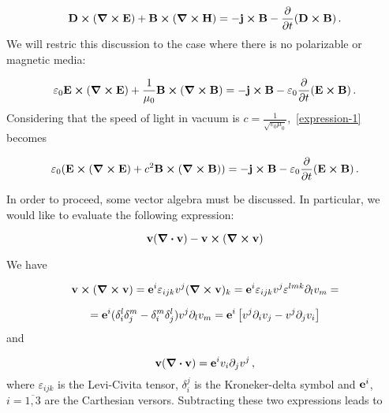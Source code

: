 \documentclass[12pt, class=report, crop=false]{standalone}
\begin{document}
\begin{equation}
  \vb{D}\cp (\curl{\vb{E}}) + \vb{B}\cp (\curl{\vb{H}}) = - \vb{j}\cp \vb{B} - \pdv{t} (\vb{D}\cp\vb{B}) \,.
\end{equation}
We will restric this discussion to the case where there is no polarizable or magnetic media:

\begin{equation}
  \label{expression-1}
  \varepsilon_0 \vb{E}\cp (\curl{\vb{E}}) + \frac{1}{\mu_0}\vb{B}\cp (\curl{\vb{B}}) = - \vb{j}\cp \vb{B} - \varepsilon_0 \pdv{t} (\vb{E}\cp\vb{B}) \,.
\end{equation}
Considering that the speed of light in vacuum is \(c=\frac{1}{\sqrt{\varepsilon_0 \mu_0}}\),~\cref{expression-1} becomes

\begin{equation}
  \label{expression-1}
  \varepsilon_0 (\vb{E}\cp (\curl{\vb{E}}) + c^{2} \vb{B}\cp (\curl{\vb{B}})) = - \vb{j}\cp \vb{B} - \varepsilon_0 \pdv{t} (\vb{E}\cp\vb{B}) \,.
\end{equation}

In order to proceed, some vector algebra must be discussed. In particular, we would like to evaluate the following expression:

\begin{equation*}
  \vb{v}(\div{\vb{v}}) - \vb{v}\cp(\curl{\vb{v}})
\end{equation*}

We have

\begin{equation*}
  \vb{v}\cp(\curl{\vb{v}}) = \vb{e}^{i} \varepsilon_{ijk} v^{j} (\curl{\vb{v}})_{k} = \vb{e}^{i} \varepsilon_{ijk} v^{j} \varepsilon^{lmk} \partial_{l} v_{m} =
\end{equation*}

\begin{equation*}
  = \vb{e}^{i} (\delta_{i}^{l}\delta_{j}^{m}-\delta_{i}^{m}\delta_{j}^{l}) v^{j} \partial_{l} v_{m} =
  \vb{e}^{i} \left[ v^{j} \partial_{i} v_{j} - v^{j} \partial_{j} v_{i} \right]
\end{equation*}
and

\begin{equation*}
  \vb{v}(\div{\vb{v}}) = \vb{e}^{i} v_{i} \partial_{j} v^{j} \,,
\end{equation*}
where \(\varepsilon_{ijk}\) is the Levi-Civita tensor, \(\delta_{i}^{j}\) is the Kroneker-delta symbol and \(\vb{e}^{i}\), \(i=\overline{1,3}\) are the Carthesian versors. Subtracting these two expressions leads to
\end{document}
